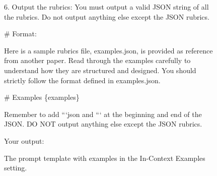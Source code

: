 \documentclass[11pt]{article}
\begin{document}
\begin{figure}[h]
\begin{tcolorbox}[]
6. Output the rubrics: You must output a valid JSON string of all the rubrics. Do not output anything else except the JSON rubrics.

\# Format:

Here is a sample rubrics file, examples.json, is provided as reference from another paper. 
Read through the examples carefully to understand how they are structured and designed.
You should strictly follow the format defined in examples.json. 

\# Examples
\{examples\}

Remember to add ```json and ``` at the beginning and end of the JSON.
DO NOT output anything else except the JSON rubrics.

Your output:
\end{tcolorbox}
\caption{The prompt template with examples in the In-Context Examples setting.}
\label{fig:in-context_prompt}
\end{figure}
\clearpage
\end{document}
